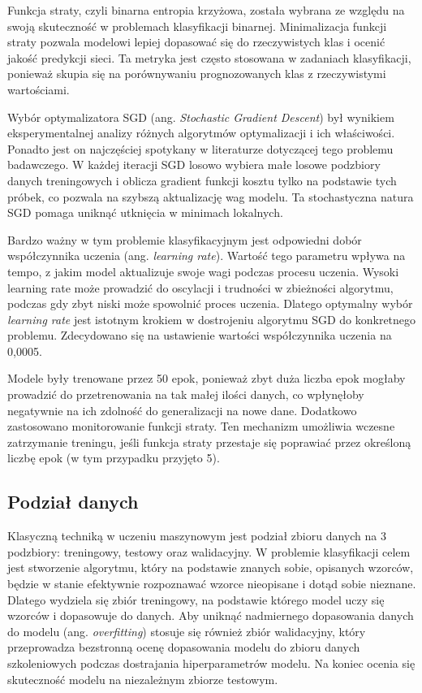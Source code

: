 Funkcja straty, czyli binarna entropia krzyżowa, została wybrana ze względu na swoją skuteczność w problemach klasyfikacji binarnej.
Minimalizacja funkcji straty pozwala modelowi lepiej dopasować się do rzeczywistych klas i ocenić jakość predykcji sieci.
Ta metryka jest często stosowana w zadaniach klasyfikacji, ponieważ skupia się na porównywaniu prognozowanych klas z rzeczywistymi wartościami.

Wybór optymalizatora SGD (ang. \emph{Stochastic Gradient Descent}) był wynikiem eksperymentalnej analizy różnych algorytmów optymalizacji i ich właściwości.
Ponadto jest on najczęściej spotykany w literaturze dotyczącej tego problemu badawczego.
W każdej iteracji SGD losowo wybiera małe losowe podzbiory danych treningowych i oblicza gradient funkcji kosztu tylko na podstawie tych próbek, co pozwala na szybszą aktualizację wag modelu.
Ta stochastyczna natura SGD pomaga uniknąć utknięcia w minimach lokalnych.

Bardzo ważny w tym problemie klasyfikacyjnym jest odpowiedni dobór współczynnika uczenia (ang. \emph{learning rate}).
Wartość tego parametru wpływa na tempo, z jakim model aktualizuje swoje wagi podczas procesu uczenia.
Wysoki learning rate może prowadzić do oscylacji i trudności w zbieżności algorytmu, podczas gdy zbyt niski może spowolnić proces uczenia.
Dlatego optymalny wybór \emph{learning rate} jest istotnym krokiem w dostrojeniu algorytmu SGD do konkretnego problemu.
Zdecydowano się na ustawienie wartości współczynnika uczenia na 0,0005.

Modele były trenowane przez 50 epok, ponieważ zbyt duża liczba epok mogłaby prowadzić do przetrenowania na tak małej ilości danych, co wpłynęłoby negatywnie na ich zdolność do generalizacji na nowe dane.
Dodatkowo zastosowano monitorowanie funkcji straty.
Ten mechanizm umożliwia wczesne zatrzymanie treningu, jeśli funkcja straty przestaje się poprawiać przez określoną liczbę epok (w tym przypadku przyjęto 5).

\subsection{Podział danych}
\label{subsec:podzial-danych}

Klasyczną techniką w uczeniu maszynowym jest podział zbioru danych na 3 podzbiory: treningowy, testowy oraz walidacyjny.
W problemie klasyfikacji celem jest stworzenie algorytmu, który na podstawie znanych sobie, opisanych wzorców, będzie w stanie efektywnie rozpoznawać wzorce nieopisane i dotąd sobie nieznane.
Dlatego wydziela się zbiór treningowy, na podstawie którego model uczy się wzorców i dopasowuje do danych.
Aby uniknąć nadmiernego dopasowania danych do modelu (ang.
\emph{overfitting}) stosuje się również zbiór walidacyjny, który  przeprowadza bezstronną ocenę dopasowania modelu do zbioru danych szkoleniowych podczas dostrajania hiperparametrów modelu.
Na koniec ocenia się skuteczność modelu na niezależnym zbiorze testowym.


